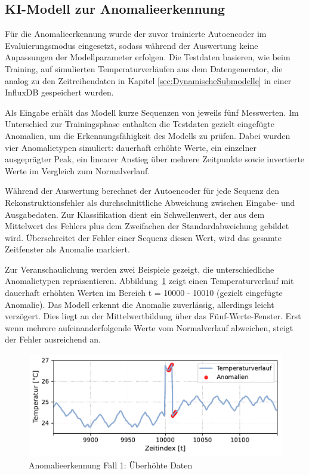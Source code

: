 \newpage
\subsection{KI-Modell zur Anomalieerkennung}

Für die Anomalieerkennung wurde der zuvor trainierte Autoencoder im Evaluierungsmodus eingesetzt, sodass während der Auswertung keine Anpassungen der Modellparameter erfolgen.
Die Testdaten basieren, wie beim Training, auf simulierten Temperaturverläufen aus dem Datengenerator, die analog zu den Zeitreihendaten in Kapitel \ref{sec:DynamischeSubmodelle} in einer InfluxDB gespeichert wurden.

Als Eingabe erhält das Modell kurze Sequenzen von jeweils fünf Messwerten.
Im Unterschied zur Trainingsphase enthalten die Testdaten gezielt eingefügte Anomalien, um die Erkennungsfähigkeit des Modells zu prüfen.
Dabei wurden vier Anomalietypen simuliert: dauerhaft erhöhte Werte, ein einzelner ausgeprägter Peak, ein linearer Anstieg über mehrere Zeitpunkte sowie invertierte Werte im Vergleich zum Normalverlauf.

Während der Auswertung berechnet der Autoencoder für jede Sequenz den Rekonstruktionsfehler als durchschnittliche Abweichung zwischen Eingabe- und Ausgabedaten. 
Zur Klassifikation dient ein Schwellenwert, der aus dem Mittelwert des Fehlers plus dem Zweifachen der Standardabweichung gebildet wird. 
Überschreitet der Fehler einer Sequenz diesen Wert, wird das gesamte Zeitfenster als Anomalie markiert.

Zur Veranschaulichung werden zwei Beispiele gezeigt, die unterschiedliche Anomalietypen repräsentieren. 
Abbildung~\ref{fig:Fall1} zeigt einen Temperaturverlauf mit dauerhaft erhöhten Werten im Bereich t = 10000 - 10010 (gezielt eingefügte Anomalie). 
Das Modell erkennt die Anomalie zuverlässig, allerdings leicht verzögert. 
Dies liegt an der Mittelwertbildung über das Fünf-Werte-Fenster.
Erst wenn mehrere aufeinanderfolgende Werte vom Normalverlauf abweichen, steigt der Fehler ausreichend an.

\begin{figure}[htbp]
    \centering
        \includegraphics[width=1\textwidth]{Bilder/Ergebnisse/KI/Fall1.pdf}
        \vspace{-2em}
    \caption{Anomalieerkennung Fall 1: Überhöhte Daten}
    \label{fig:Fall1}
\end{figure}
\vspace{-0.5em}

